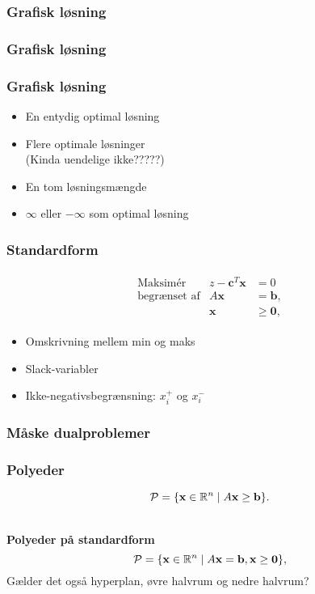 \begin{frame}
\frametitle{Grafisk løsning}

\end{frame}

\begin{frame}
\frametitle{Grafisk løsning}

\end{frame}

\begin{frame}
\frametitle{Grafisk løsning}
\begin{itemize}
\item En entydig optimal løsning
\item Flere optimale løsninger 
\\
(Kinda uendelige ikke?????)
\item En tom løsningsmængde
\item $\infty$ eller $-\infty$ som optimal løsning 
\end{itemize}
\end{frame}

\begin{frame}
\frametitle{Standardform}
\begin{align*}
\begin{array}{lrl}
\text{Maksimér}		&z - \textbf{c}^T\textbf{x}	&	=0		\\
\text{begrænset af}	&A\textbf{x}	&=\mathbf{b},	\\
					&\mathbf{x}				&\geq \mathbf{0},
\end{array}
\end{align*}
\begin{itemize}
\item Omskrivning mellem min og maks 
\item Slack-variabler
\item Ikke-negativsbegrænsning: $x_i^+$ og $x_i^-$
\end{itemize}
\end{frame}

\begin{frame}
\frametitle{Måske dualproblemer}

\end{frame}

\begin{frame}
\frametitle{Polyeder}
$$\mathcal{P} = \{\textbf{x} \in \R^n \mid A\mathbf{x}\geq \textbf{b}\}.$$
\\
$
\begin{array}{cc}
&

\end{array}
$
\\
\textbf{Polyeder på standardform} 
$$\mathcal{P}=\{ \mathbf{x} \in \R^n  \mid  A\mathbf{x}=\mathbf{b}, \mathbf{x} \geq \mathbf{0} \},$$
Gælder det også hyperplan, øvre halvrum og nedre halvrum?
\end{frame}

